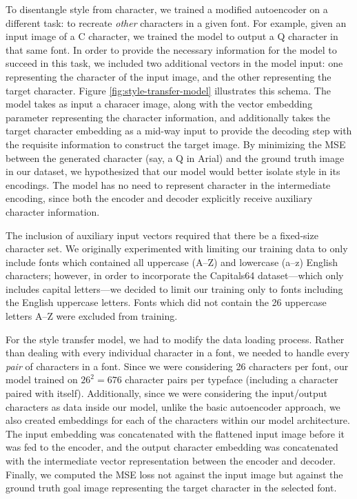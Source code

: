 To disentangle style from character, we trained a modified autoencoder on a different task: to recreate \textit{other} characters in a given font. For example, given an input image of a C character, we trained the model to output a Q character in that same font. In order to provide the necessary information for the model to succeed in this task, we included two additional vectors in the model input: one representing the character of the input image, and the other representing the target character. Figure \ref{fig:style-transfer-model} illustrates this schema. The model takes as input a characer image, along with the vector embedding parameter representing the character information, and additionally takes the target character embedding as a mid-way input to provide the decoding step with the requisite information to construct the target image. By minimizing the MSE between the generated character (say, a { Q} in Arial) and the ground truth image in our dataset, we hypothesized that our model would better isolate style in its encodings. The model has no need to represent character in the intermediate encoding, since both the encoder and decoder explicitly receive auxiliary character information. 

The inclusion of auxiliary input vectors required that there be a fixed-size character set. We originally experimented with limiting our training data to only include fonts which contained all uppercase (A--Z) and lowercase (a--z) English characters; however, in order to incorporate the Capitals64 dataset---which only includes capital letters---we decided to limit our training only to fonts including the English uppercase letters. Fonts which did not contain the 26 uppercase letters A--Z were excluded from training.

For the style transfer model, we had to modify the data loading process. Rather than dealing with every individual character in a font, we needed to handle every \textit{pair} of characters in a font. Since we were considering 26 characters per font, our model trained on $26^2 = 676$ character pairs per typeface (including a character paired with itself). Additionally, since we were considering the input/output characters as data inside our model, unlike the basic autoencoder approach, we also created embeddings for each of the characters within our model architecture. The input embedding was concatenated with the flattened input image before it was fed to the encoder, and the output character embedding was concatenated with the intermediate vector representation between the encoder and decoder. Finally, we computed the MSE loss not against the input image but against the ground truth goal image representing the target character in the selected font.

